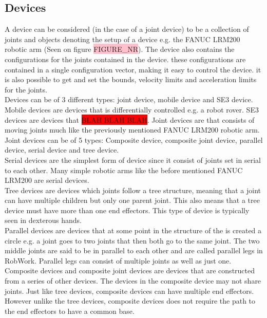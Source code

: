 \subsection{Devices}
A device can be considered (in the case of a joint device) to be a collection of joints and objects denoting the setup of a device e.g. the FANUC LRM200 robotic arm (Seen on figure \colorbox{pink}{FIGURE_NR}). The device also contains the configurations for the joints contained in the device. these configurations are contained in a single configuration vector, making it easy to control the device. it is also possible to get and set the bounds, velocity limits and acceleration limits for the joints.\\

Devices can be of 3 different types: joint device, mobile device and SE3 device. Mobile devices are devices that  is differentially controlled e.g. a robot rover. SE3 devices are devices that \colorbox{red}{BLAH BLAH BLAH}. Joint devices are that consists of moving joints much like the previously mentioned FANUC LRM200 robotic arm.\\

Joint devices can be of 5 types: Composite device, composite joint device, parallel device, serial device and tree device.\\
Serial devices are the simplest form of device since it consist of joints set in serial to each other. Many simple robotic arms like the before mentioned FANUC LRM200 are serial devices.\\
Tree devices are devices which joints follow a tree structure, meaning that a joint can have multiple children but only one parent joint. This also means that a tree device must have more than one end effectors. This type of device is typically seen in dexterous hands.\\
Parallel devices are devices that at some point in the structure of the is created a circle e.g. a joint goes to two joints that then both go to the same joint. The two middle joints are said to be in parallel to each other and are called parallel legs in RobWork. Parallel legs can consist of multiple joints as well as just one.\\
Composite devices and composite joint devices are devices that are constructed from a series of other devices. The devices in the composite device may not share joints. Just like tree devices, composite devices can have multiple end effectors. However unlike the tree devices, composite devices does not require the path to the end effectors to have a common base.


